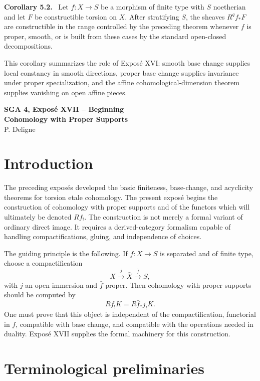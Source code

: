 \documentclass[12pt]{article}
\newenvironment{statement}[1]{\par\medskip\noindent\textbf{#1.}\ }{\par\medskip}
\begin{document}
\begin{statement}{Corollary 5.2}
Let \(f:X\to S\) be a morphism of finite type with \(S\) noetherian and let \(F\) be constructible torsion on \(X\). After stratifying \(S\), the sheaves \(R^qf_*F\) are constructible in the range controlled by the preceding theorem whenever \(f\) is proper, smooth, or is built from these cases by the standard open-closed decompositions.
\end{statement}

This corollary summarizes the role of Expos\'e XVI: smooth base change supplies local constancy in smooth directions, proper base change supplies invariance under proper specialization, and the affine cohomological-dimension theorem supplies vanishing on open affine pieces.

\clearpage
\begin{center}
{\Large \textbf{SGA 4, Expos\'e XVII -- Beginning}}\\[0.35em]
{\large \textbf{Cohomology with Proper Supports}}\\[0.25em]
{\normalsize P. Deligne}
\end{center}

\section*{Introduction}

The preceding expos\'es developed the basic finiteness, base-change, and acyclicity theorems for torsion etale cohomology. The present expos\'e begins the construction of cohomology with proper supports and of the functors which will ultimately be denoted \(Rf_!\). The construction is not merely a formal variant of ordinary direct image. It requires a derived-category formalism capable of handling compactifications, gluing, and independence of choices.

The guiding principle is the following. If \(f:X\to S\) is separated and of finite type, choose a compactification
\[
X\xrightarrow{j}\bar X\xrightarrow{\bar f}S,
\]
with \(j\) an open immersion and \(\bar f\) proper. Then cohomology with proper supports should be computed by
\[
Rf_!K=R\bar f_*j_!K.
\]
One must prove that this object is independent of the compactification, functorial in \(f\), compatible with base change, and compatible with the operations needed in duality. Expos\'e XVII supplies the formal machinery for this construction.

\section{Terminological preliminaries}
\end{document}
